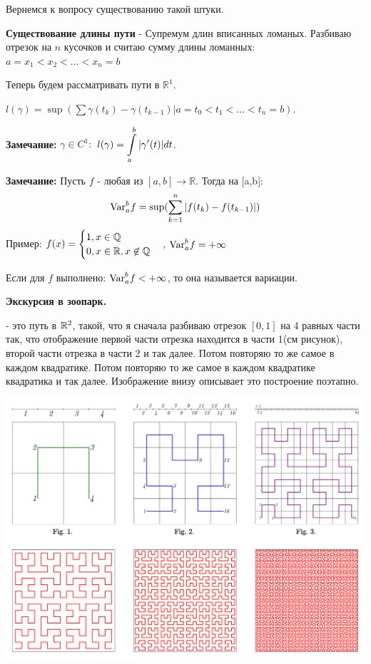 Вернемся к вопросу существованию такой штуки.

\textbf{Существование длины пути} - Супремум длин вписанных ломаных. Разбиваю отрезок на $n$ кусочков и считаю сумму длины ломанных: $a=x_1<x_2<\ldots<x_n =b$

Теперь будем рассматривать пути в $\mathbb{R}^1$.

$l(\gamma) = \sup (\sum\limits\gamma(t_k)-\gamma(t_{k-1}) | a = t_0<t_1<\ldots<t_n=b)$.

\textbf{Замечание:} $\gamma \in C^1:$ $l(\gamma) = \displaystyle\int\limits_{a}^{b}|\gamma'(t)|dt$.

\textbf{Замечание:} Пусть $f$ - любая из $[a,b] \rightarrow \mathbb{R}$. Тогда  на [a,b]: $$\text{Var}_a^b f = \sup (\sum\limits_{k=1}^n |f(t_k)-f(t_{k-1})|)$$
Пример:
$f(x) = \begin{cases}
    1,x \in \mathbb{Q} \\
    0, x \in \mathbb{R}, x\not \in \mathbb{Q} 
\end{cases}$, $\text{Var}_{a}^b f = +\infty$

Если для $f$ выполнено: $\text{Var}_a^b f < + \infty$, то она называется  вариации.

\textbf{Экскурсия в зоопарк.}

 - это путь в $\mathbb{R}^2$, такой, что я сначала разбиваю отрезок $[0,1]$ на 4 равных части так, что отображение первой части отрезка находится в части 1(см рисунок), второй части отрезка в части 2 и так далее. Потом повторяю то же самое в каждом квадратике. Потом повторяю то же самое в каждом квадратике квадратика и так далее. Изображение внизу описывает это построение поэтапно.

\begin{center}
   \includegraphics[width = 15 cm]{assets/integral_hilbert_curve.svg.png}
\end{center}

